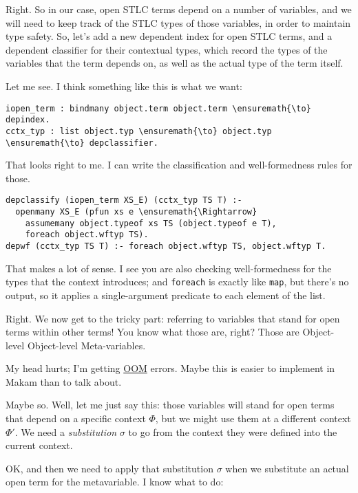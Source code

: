 \heroADVISOR{} Right. So in our case, open STLC terms depend on a number of
variables, and we will need to keep track of the STLC types of those
variables, in order to maintain type safety. So, let's add a new
dependent index for open STLC terms, and a dependent classifier for
their contextual types, which record the types of the variables that the
term depends on, as well as the actual type of the term itself.

\heroSTUDENT{} Let me see. I think something like this is what we want:

\begin{verbatim}
iopen_term : bindmany object.term object.term \ensuremath{\to} depindex.
cctx_typ : list object.typ \ensuremath{\to} object.typ \ensuremath{\to} depclassifier.
\end{verbatim}

\heroADVISOR{} That looks right to me. I can write the classification and
well-formedness rules for those.

\begin{verbatim}
depclassify (iopen_term XS_E) (cctx_typ TS T) :-
  openmany XS_E (pfun xs e \ensuremath{\Rightarrow}
    assumemany object.typeof xs TS (object.typeof e T),
    foreach object.wftyp TS).
depwf (cctx_typ TS T) :- foreach object.wftyp TS, object.wftyp T.
\end{verbatim}

\heroSTUDENT{} That makes a lot of sense. I see you are also checking
well-formedness for the types that the context introduces; and
\texttt{foreach} is exactly like \texttt{map}, but there's no output, so
it applies a single-argument predicate to each element of the list.

\heroADVISOR{} Right. We now get to the tricky part: referring to variables
that stand for open terms within other terms! You know what those are,
right? Those are Object-level Object-level Meta-variables.

\heroSTUDENT{} My head hurts; I'm getting
\href{https://en.wikipedia.org/wiki/Out_of_memory}{OOM} errors. Maybe
this is easier to implement in Makam than to talk about.

\heroADVISOR{} Maybe so. Well, let me just say this: those variables will
stand for open terms that depend on a specific context \(\Phi\), but we
might use them at a different context \(\Phi'\). We need a
\emph{substitution} \(\sigma\) to go from the context they were defined
into the current context.

\heroSTUDENT{} OK, and then we need to apply that substitution \(\sigma\) when
we substitute an actual open term for the metavariable. I know what to
do:

